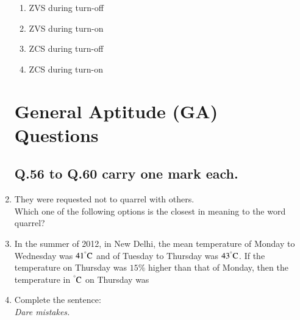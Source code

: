 \documentclass[journal,12pt,onecolumn]{IEEEtran}
\theoremstyle{remark}
\begin{document}
\begin{enumerate}
\begin{enumerate}
\item ZVS during turn-off
\item ZVS during turn-on
\item ZCS during turn-off
\item ZCS during turn-on
\end{enumerate}



\section*{General Aptitude (GA) Questions}

\subsection*{Q.56 to Q.60 carry one mark each.}

\item They were requested not to quarrel with others.\\
Which one of the following options is the closest in meaning to the word quarrel?
\begin{enumerate}
\end{enumerate}

\item In the summer of 2012, in New Delhi, the mean temperature of Monday to Wednesday was
$41^{\degree}\text{C}$ and of Tuesday to Thursday was $43^{\degree}\text{C}$. If the temperature on Thursday
was $15\%$ higher than that of Monday, then the temperature in $^{\degree}\text{C}$ on Thursday was
\begin{enumerate}
\end{enumerate}

\item Complete the sentence:\\
\emph{Dare \underline{\phantom{to commit}} mistakes.}
\begin{enumerate}
\begin{multicols}{4}
    


\end{multicols}
\end{enumerate}
\end{enumerate}
\end{document}
